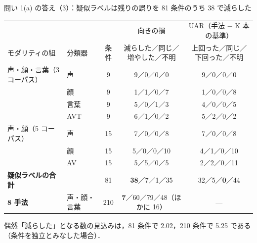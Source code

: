 \begin{frame}{問い 1(a) の答え（3）：疑似ラベルは残りの誤りを 81 条件のうち 38 で減らした}
\scriptsize
{\centering\tiny
\begin{tabular}{@{}llccc@{}}
\toprule
 & & & 向きの損 & UAR（手法 − K 本の基準） \\
モダリティの組 & 分類器 & 条件 & 減らした／同じ／増やした／不明 & 上回った／同じ／下回った／不明 \\
\midrule
声・顔・言葉（3 コーパス） & 声 & 9 & 9／0／0／0 & 9／0／0／0 \\
 & 顔 & 9 & 1／1／0／7 & 1／0／0／8 \\
 & 言葉 & 9 & 5／0／1／3 & 4／0／0／5 \\
 & AVT & 9 & 6／1／0／2 & 5／2／0／2 \\
声・顔（5 コーパス） & 声 & 15 & 7／0／0／8 & 7／0／0／8 \\
 & 顔 & 15 & 5／0／0／10 & 4／1／0／10 \\
 & AV & 15 & 5／5／0／5 & 2／2／0／11 \\
\midrule
\textbf{疑似ラベルの合計} & & 81 & \textbf{38}／7／1／35 & 32／5／\textbf{0}／44 \\
\textbf{8 手法} & 声・顔・言葉 & 210 & \textbf{7}／60／79／48（ほかに 16） & — \\
\bottomrule
\end{tabular}\par}
偶然「減らした」となる数の見込みは，81 条件で 2.02，210 条件で 5.25 である（条件を独立とみなした場合）．
\end{frame}

